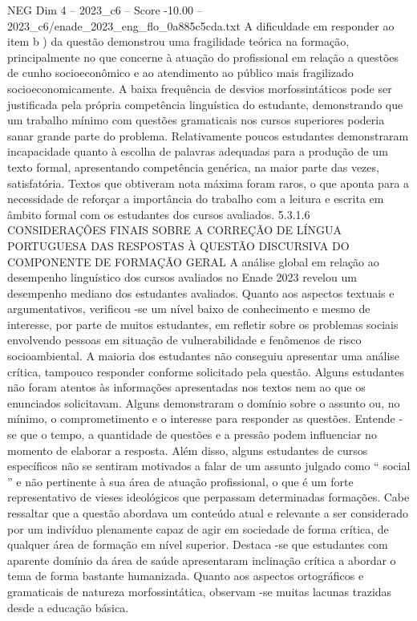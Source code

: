 \begin{textsample}{NEG Dim 4 – 2023\_c6 – Score -10.00 – 2023\_c6/enade\_2023\_eng\_flo\_0a885c5cda.txt}
A dificuldade em responder ao item b ) da questão demonstrou uma fragilidade teórica na formação, principalmente no que concerne à atuação do profissional em relação a questões de cunho socioeconômico e ao atendimento ao público mais fragilizado socioeconomicamente.
A baixa frequência de desvios morfossintáticos pode ser justificada pela própria competência linguística do estudante, demonstrando que um trabalho mínimo com questões gramaticais nos cursos superiores poderia sanar grande parte do problema.
Relativamente poucos estudantes demonstraram incapacidade quanto à escolha de palavras adequadas para a produção de um texto formal, apresentando competência genérica, na maior parte das vezes, satisfatória.
Textos que obtiveram nota máxima foram raros, o que aponta para a necessidade de reforçar a importância do trabalho com a leitura e escrita em âmbito formal com os estudantes dos cursos avaliados. 5.3.1.6 CONSIDERAÇÕES FINAIS SOBRE A CORREÇÃO DE LÍNGUA PORTUGUESA DAS RESPOSTAS À QUESTÃO DISCURSIVA DO COMPONENTE DE FORMAÇÃO GERAL A análise global em relação ao desempenho linguístico dos cursos avaliados no Enade 2023 revelou um desempenho mediano dos estudantes avaliados.
Quanto aos aspectos textuais e argumentativos, verificou -se um nível baixo de conhecimento e mesmo de interesse, por parte de muitos estudantes, em refletir sobre os problemas sociais envolvendo pessoas em situação de vulnerabilidade e fenômenos de risco socioambiental.
A maioria dos estudantes não conseguiu apresentar uma análise crítica, tampouco responder conforme solicitado pela questão.
Alguns estudantes não foram atentos às informações apresentadas nos textos nem ao que os enunciados solicitavam.
Alguns demonstraram o domínio sobre o assunto ou, no mínimo, o comprometimento e o interesse para responder as questões.
Entende -se que o tempo, a quantidade de questões e a pressão podem influenciar no momento de elaborar a resposta.
Além disso, alguns estudantes de cursos específicos não se sentiram motivados a falar de um assunto julgado como “ social ” e não pertinente à sua área de atuação profissional, o que é um forte representativo de vieses ideológicos que perpassam determinadas formações.
Cabe ressaltar que a questão abordava um conteúdo atual e relevante a ser considerado por um indivíduo plenamente capaz de agir em sociedade de forma crítica, de qualquer área de formação em nível superior.
Destaca -se que estudantes com aparente domínio da área de saúde apresentaram inclinação crítica a abordar o tema de forma bastante humanizada.
Quanto aos aspectos ortográficos e gramaticais de natureza morfossintática, observam -se muitas lacunas trazidas desde a educação básica.

\end{textsample}
